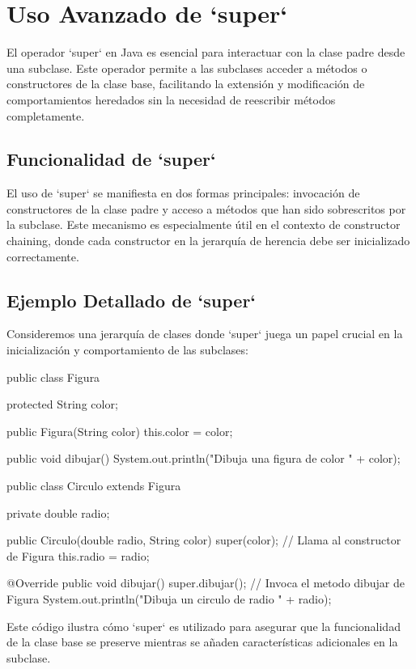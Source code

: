 \documentclass[a4paper]{report}
\begin{document}
\section{Uso Avanzado de `super`}
El operador `super` en Java es esencial para interactuar con la clase padre desde una subclase. Este operador permite a las subclases acceder a métodos o constructores de la clase base, facilitando la extensión y modificación de comportamientos heredados sin la necesidad de reescribir métodos completamente.

\subsection{Funcionalidad de `super`}
El uso de `super` se manifiesta en dos formas principales: invocación de constructores de la clase padre y acceso a métodos que han sido sobrescritos por la subclase. Este mecanismo es especialmente útil en el contexto de constructor chaining, donde cada constructor en la jerarquía de herencia debe ser inicializado correctamente.

\subsection{Ejemplo Detallado de `super`}
Consideremos una jerarquía de clases donde `super` juega un papel crucial en la inicialización y comportamiento de las subclases:

\begin{roundedlst}
public class Figura {
    protected String color;

    public Figura(String color) {
        this.color = color;
    }

    public void dibujar() {
        System.out.println("Dibuja una figura de color " 
                           + color);
    }
}

public class Circulo extends Figura {
    private double radio;

    public Circulo(double radio, String color) {
        super(color);  // Llama al constructor de Figura
        this.radio = radio;
    }

    @Override
    public void dibujar() {
        super.dibujar();  
        // Invoca el metodo dibujar de Figura
        System.out.println("Dibuja un circulo de radio "
                           + radio);
    }
}
\end{roundedlst}

Este código ilustra cómo `super` es utilizado para asegurar que la funcionalidad de la clase base se preserve mientras se añaden características adicionales en la subclase.
\end{document}
